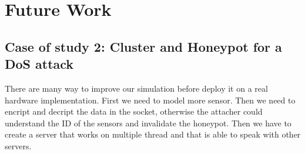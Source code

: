 \section{Future Work}
\subsection{Case of study 2: Cluster and Honeypot for a DoS attack}
There are many way to improve our simulation before deploy it on a real hardware implementation. First we need to model more sensor. Then we need to encript and decript the data in the socket, otherwise the attacher could understand the ID of the sensors and invalidate the honeypot. Then we have to create a server that works on multiple thread and that is able to speak with other servers. 